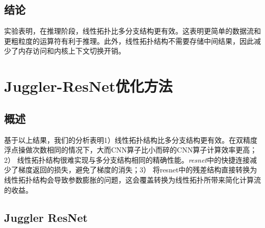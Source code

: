 \subsection{结论}
实验表明，在推理阶段，线性拓扑比多分支结构更有效。这表明更简单的数据流和更粗粒度的运算符有利于推理。此外，线性拓扑结构不需要存储中间结果，因此减少了内存访问和内核上下文切换开销。

\section{Juggler-ResNet优化方法}

\subsection{概述}
基于以上结果，我们的分析表明1）线性拓扑结构比多分支结构更有效。在双精度浮点操做次数相同的情况下，大而CNN算子比小而碎的CNN算子计算效率更高；2） 线性拓扑结构很难实现与多分支结构相同的精确性能。\emph{resnet}中的快捷连接减少了梯度返回的损失，避免了梯度的消失；3） 将resnet中的残差结构直接转换为线性拓扑结构会导致参数膨胀的问题，这会覆盖转换为线性拓扑所带来简化计算流的收益。


\subsection{Juggler ResNet}


